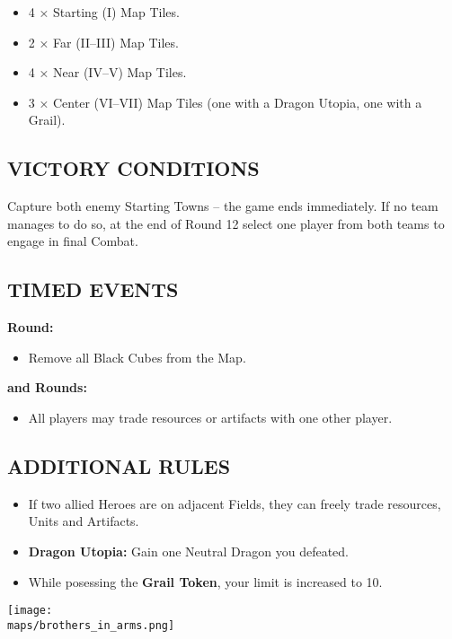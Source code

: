 \begin{multicols*}{2}
\begin{itemize}
  \item 4 × Starting (I) Map Tiles.
  \item 2 × Far (II–III) Map Tiles.
  \item 4 × Near (IV–V) Map Tiles.
  \item 3 × Center (VI–VII) Map Tiles (one with a Dragon Utopia, one with a Grail).
\end{itemize}

\subsection*{\MakeUppercase{Victory Conditions}}
Capture both enemy Starting Towns -- the game ends immediately.
If no team manages to do so, at the end of Round 12 select one player from both teams to engage in final Combat.

\subsection*{\MakeUppercase{Timed Events}}
\textbf{ Round:}
\begin{itemize}
  \item Remove all Black Cubes from the Map.
\end{itemize}
\textbf{ and  Rounds:}
\begin{itemize}
  \item All players may trade resources or artifacts with one other player.
\end{itemize}

\subsection*{\MakeUppercase{Additional Rules}}
\begin{itemize}
  \item If two allied Heroes are on adjacent Fields, they can freely trade resources, Units and Artifacts.
  \item \textbf{Dragon Utopia:} Gain one Neutral Dragon you defeated.
  \item While posessing the \textbf{Grail Token}, your  limit is increased to 10.
\end{itemize}

\vspace*{\fill}
\hspace*{-1.5em}\texttt{[image: \\maps/brothers\_in\_arms.png]}
\end{multicols*}

